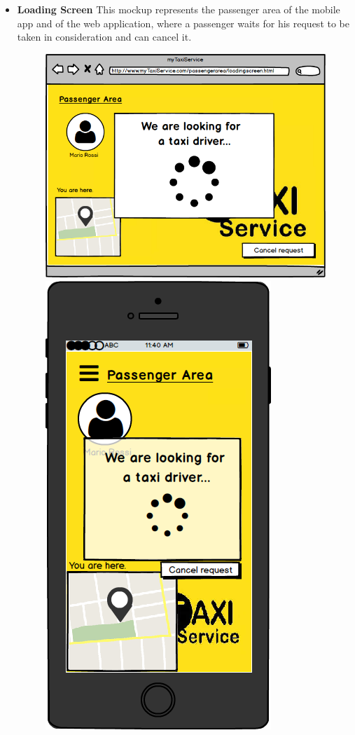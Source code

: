 \documentclass[18pt,oneside,a4paper, titlepage]{article}
\begin{document}
\begin{itemize}
\begin{figure}[h]
				\end{figure}
				\\
				\item \textbf{Loading Screen} This mockup represents the passenger area of the mobile app and of the web application, where a passenger waits for his request to be taken in consideration and can cancel it.\\
				\begin{figure}[h]
					\includegraphics[scale=0.3]{Mockups/WebAppWaitForTaxi.png}%
					\qquad\qquad
					\includegraphics[scale=0.3]{Mockups/MobileAppWaitForTaxi.png}

\end{figure}
\end{itemize}
\end{document}
